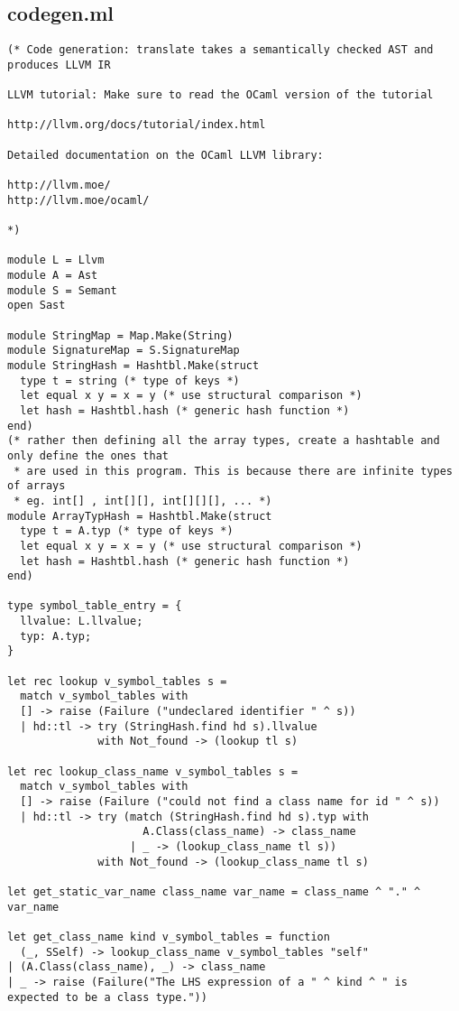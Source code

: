 \documentclass{article}
\begin{document}
\subsection{codegen.ml}
\label{sec:codegenml}
\begin{verbatim}
(* Code generation: translate takes a semantically checked AST and
produces LLVM IR

LLVM tutorial: Make sure to read the OCaml version of the tutorial

http://llvm.org/docs/tutorial/index.html

Detailed documentation on the OCaml LLVM library:

http://llvm.moe/
http://llvm.moe/ocaml/

*)

module L = Llvm
module A = Ast
module S = Semant
open Sast 

module StringMap = Map.Make(String)
module SignatureMap = S.SignatureMap
module StringHash = Hashtbl.Make(struct
  type t = string (* type of keys *)
  let equal x y = x = y (* use structural comparison *)
  let hash = Hashtbl.hash (* generic hash function *)
end)
(* rather then defining all the array types, create a hashtable and only define the ones that 
 * are used in this program. This is because there are infinite types of arrays 
 * eg. int[] , int[][], int[][][], ... *)
module ArrayTypHash = Hashtbl.Make(struct
  type t = A.typ (* type of keys *)
  let equal x y = x = y (* use structural comparison *)
  let hash = Hashtbl.hash (* generic hash function *)
end)

type symbol_table_entry = {
  llvalue: L.llvalue;
  typ: A.typ;
}

let rec lookup v_symbol_tables s =
  match v_symbol_tables with
  [] -> raise (Failure ("undeclared identifier " ^ s))
  | hd::tl -> try (StringHash.find hd s).llvalue
              with Not_found -> (lookup tl s)

let rec lookup_class_name v_symbol_tables s =
  match v_symbol_tables with
  [] -> raise (Failure ("could not find a class name for id " ^ s))
  | hd::tl -> try (match (StringHash.find hd s).typ with
                     A.Class(class_name) -> class_name
                   | _ -> (lookup_class_name tl s))
              with Not_found -> (lookup_class_name tl s)

let get_static_var_name class_name var_name = class_name ^ "." ^ var_name
  
let get_class_name kind v_symbol_tables = function
  (_, SSelf) -> lookup_class_name v_symbol_tables "self"
| (A.Class(class_name), _) -> class_name
| _ -> raise (Failure("The LHS expression of a " ^ kind ^ " is expected to be a class type."))


\end{verbatim}
\end{document}
